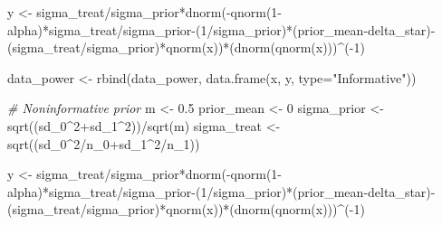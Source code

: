 \documentclass[
]{book}
\newenvironment{Shaded}{\begin{snugshade}}{\end{snugshade}}
\newcommand{\AttributeTok}[1]{\textcolor[rgb]{0.77,0.63,0.00}{#1}}
\newcommand{\CommentTok}[1]{\textcolor[rgb]{0.56,0.35,0.01}{\textit{#1}}}
\newcommand{\DecValTok}[1]{\textcolor[rgb]{0.00,0.00,0.81}{#1}}
\newcommand{\FloatTok}[1]{\textcolor[rgb]{0.00,0.00,0.81}{#1}}
\newcommand{\FunctionTok}[1]{\textcolor[rgb]{0.00,0.00,0.00}{#1}}
\newcommand{\NormalTok}[1]{#1}
\newcommand{\OtherTok}[1]{\textcolor[rgb]{0.56,0.35,0.01}{#1}}
\newcommand{\SpecialCharTok}[1]{\textcolor[rgb]{0.00,0.00,0.00}{#1}}
\newcommand{\StringTok}[1]{\textcolor[rgb]{0.31,0.60,0.02}{#1}}
\begin{document}
\begin{Shaded}
\begin{Highlighting}[]
\NormalTok{y }\OtherTok{\textless{}{-}}\NormalTok{ sigma\_treat}\SpecialCharTok{/}\NormalTok{sigma\_prior}\SpecialCharTok{*}\FunctionTok{dnorm}\NormalTok{(}\SpecialCharTok{{-}}\FunctionTok{qnorm}\NormalTok{(}\DecValTok{1}\SpecialCharTok{{-}}\NormalTok{alpha)}\SpecialCharTok{*}\NormalTok{sigma\_treat}\SpecialCharTok{/}\NormalTok{sigma\_prior}\SpecialCharTok{{-}}\NormalTok{(}\DecValTok{1}\SpecialCharTok{/}\NormalTok{sigma\_prior)}\SpecialCharTok{*}\NormalTok{(prior\_mean}\SpecialCharTok{{-}}\NormalTok{delta\_star)}\SpecialCharTok{{-}}\NormalTok{(sigma\_treat}\SpecialCharTok{/}\NormalTok{sigma\_prior)}\SpecialCharTok{*}\FunctionTok{qnorm}\NormalTok{(x))}\SpecialCharTok{*}\NormalTok{(}\FunctionTok{dnorm}\NormalTok{(}\FunctionTok{qnorm}\NormalTok{(x)))}\SpecialCharTok{\^{}}\NormalTok{(}\SpecialCharTok{{-}}\DecValTok{1}\NormalTok{)}

\NormalTok{data\_power }\OtherTok{\textless{}{-}} \FunctionTok{rbind}\NormalTok{(data\_power, }\FunctionTok{data.frame}\NormalTok{(x, y, }\AttributeTok{type=}\StringTok{"Informative"}\NormalTok{))}

\CommentTok{\# Noninformative prior}
\NormalTok{m }\OtherTok{\textless{}{-}} \FloatTok{0.5}
\NormalTok{prior\_mean }\OtherTok{\textless{}{-}} \DecValTok{0}
\NormalTok{sigma\_prior }\OtherTok{\textless{}{-}} \FunctionTok{sqrt}\NormalTok{((sd\_0}\SpecialCharTok{\^{}}\DecValTok{2}\SpecialCharTok{+}\NormalTok{sd\_1}\SpecialCharTok{\^{}}\DecValTok{2}\NormalTok{))}\SpecialCharTok{/}\FunctionTok{sqrt}\NormalTok{(m)}
\NormalTok{sigma\_treat }\OtherTok{\textless{}{-}} \FunctionTok{sqrt}\NormalTok{((sd\_0}\SpecialCharTok{\^{}}\DecValTok{2}\SpecialCharTok{/}\NormalTok{n\_0}\SpecialCharTok{+}\NormalTok{sd\_1}\SpecialCharTok{\^{}}\DecValTok{2}\SpecialCharTok{/}\NormalTok{n\_1))}

\NormalTok{y }\OtherTok{\textless{}{-}}\NormalTok{ sigma\_treat}\SpecialCharTok{/}\NormalTok{sigma\_prior}\SpecialCharTok{*}\FunctionTok{dnorm}\NormalTok{(}\SpecialCharTok{{-}}\FunctionTok{qnorm}\NormalTok{(}\DecValTok{1}\SpecialCharTok{{-}}\NormalTok{alpha)}\SpecialCharTok{*}\NormalTok{sigma\_treat}\SpecialCharTok{/}\NormalTok{sigma\_prior}\SpecialCharTok{{-}}\NormalTok{(}\DecValTok{1}\SpecialCharTok{/}\NormalTok{sigma\_prior)}\SpecialCharTok{*}\NormalTok{(prior\_mean}\SpecialCharTok{{-}}\NormalTok{delta\_star)}\SpecialCharTok{{-}}\NormalTok{(sigma\_treat}\SpecialCharTok{/}\NormalTok{sigma\_prior)}\SpecialCharTok{*}\FunctionTok{qnorm}\NormalTok{(x))}\SpecialCharTok{*}\NormalTok{(}\FunctionTok{dnorm}\NormalTok{(}\FunctionTok{qnorm}\NormalTok{(x)))}\SpecialCharTok{\^{}}\NormalTok{(}\SpecialCharTok{{-}}\DecValTok{1}\NormalTok{)}


\end{Highlighting}
\end{Shaded}
\end{document}
